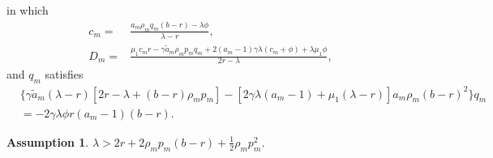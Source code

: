 \documentclass[11pt]{article}
\newtheorem{assumption}{Assumption}[section]
\numberwithin{equation}{section}
\begin{document}
	in which
	\begin{align}
		c_{\scriptscriptstyle m} =&\frac{a_{\scriptscriptstyle m}\rho_{\scriptscriptstyle m} q_{\scriptscriptstyle m}(b-r)-\lambda\phi}{\lambda-r},\label{eq:MFc1}\\
		D_{\scriptscriptstyle m}=&\frac{\mu_1 c_{\scriptscriptstyle m}r-\gamma  \tilde{a}_{\scriptscriptstyle m}\rho_{\scriptscriptstyle m} p_{\scriptscriptstyle m}q_{\scriptscriptstyle m}+2(a_{\scriptscriptstyle m}-1)\gamma \lambda(c_{\scriptscriptstyle m}+\phi)+\lambda\mu_1\phi}{2r-\lambda},\label{eq:MFD1}
	\end{align}
	and \(q_{\scriptscriptstyle m}\) satisfies
	\begin{align}
		&\{\gamma \tilde{a}_{\scriptscriptstyle m}(\lambda-r)[2r-\lambda+(b-r)\rho_{\scriptscriptstyle m} p_{\scriptscriptstyle m}]-[2\gamma\lambda(a_{\scriptscriptstyle m}-1)+\mu_1(\lambda-r)]a_{\scriptscriptstyle m}\rho_{\scriptscriptstyle m}(b-r)^2\}q_{\scriptscriptstyle m}\\
		&=-2\gamma\lambda\phi r(a_{\scriptscriptstyle m}-1)(b-r).\label{eq:MFq2}
	\end{align}

\begin{assumption}\label{assum:mf}
		$\lambda >
		2r+2\rho_{\scriptscriptstyle m} p_{\scriptscriptstyle m}(b-r)+\tfrac{1}{2}\rho_{\scriptscriptstyle m} p_{\scriptscriptstyle m}^2$.
	\end{assumption}
	
\end{document}
